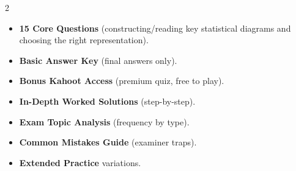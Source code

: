 \documentclass[11pt,a4paper]{article}
\newcommand{\FullReleaseDate}{April 30, 2026}
\begin{document}
\vspace{8pt}

\begin{multicols}{2}
  \begin{tcolorbox}[card, title=\sffamily\bfseries\textcolor{white}{\faHandPointDown\ TODAY (Simplified Version)}, colbacktitle=mainblue, boxed title style={sharp corners, boxrule=0pt}]
    \begin{itemize}[leftmargin=1.2em, itemsep=2pt]
      \item \small \textbf{15 Core Questions} (constructing/reading key statistical diagrams and choosing the right representation).
      \item \small \textbf{Basic Answer Key} (final answers only).
      \item \small \textbf{Bonus Kahoot Access} (premium quiz, free to play).
    \end{itemize}
  \end{tcolorbox}

  \columnbreak

  \begin{tcolorbox}[card, title=\sffamily\bfseries\textcolor{white}{\faRocket\ ON \FullReleaseDate\ (Full Upgrade)}, colbacktitle=mainblue, boxed title style={sharp corners, boxrule=0pt}]
    \begin{itemize}[leftmargin=1.2em, itemsep=2pt]
      \item \small \textbf{In-Depth Worked Solutions} (step-by-step).
      \item \small \textbf{Exam Topic Analysis} (frequency by type).
      \item \small \textbf{Common Mistakes Guide} (examiner traps).
      \item \small \textbf{Extended Practice} variations.
    \end{itemize}
  \end{tcolorbox}
\end{multicols}
\end{document}
